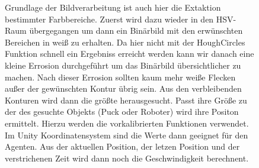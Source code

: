 \begin{figure} [h]
\begin{minipage}[t]{0.35\textwidth}
\vspace{0pt}
Grundlage der Bildverarbeitung ist auch hier die Extaktion bestimmter Farbbereiche. Zuerst wird dazu wieder in den HSV- Raum übergegangen um dann ein Binärbild mit den erwünschten Bereichen in weiß zu erhalten. Da hier nicht mit der HoughCircles Funktion schnell ein Ergebniss erreicht werden kann wir danach eine kleine Errosion durchgeführt um das Binärbild übersichtlicher zu machen. Nach dieser Errosion sollten kaum mehr weiße Flecken außer der gewünschten Kontur übrig sein. Aus den verbleibenden Konturen wird dann die größte herausgesucht. Passt ihre Größe zu der des gesuchte Objekts (Puck oder Roboter) wird ihre Positon ermittelt. Hierzu werden die vorkalibrierten Funktionen verwendet. Im Unity Koordinatensystem sind die Werte dann geeignet für den Agenten. Aus der aktuellen Position, der letzen Position und der verstrichenen Zeit wird dann noch die Geschwindigkeit berechnent. 


\end{minipage}
\end{figure}
